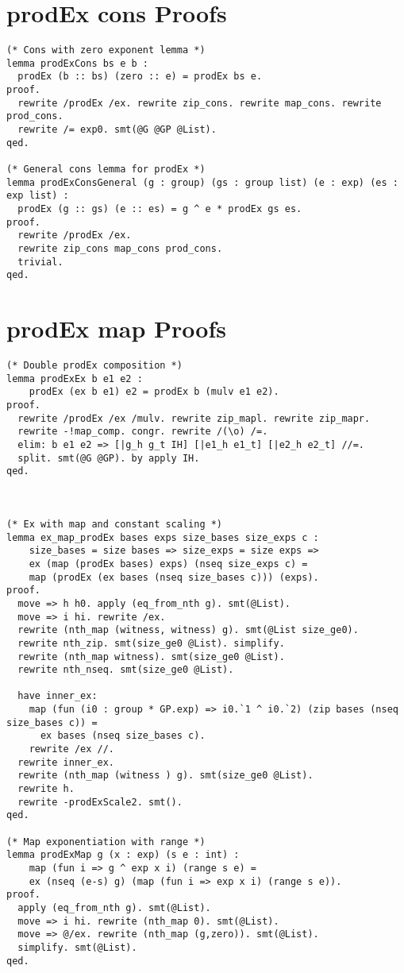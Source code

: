 \section{prodEx cons Proofs}
\label{sec:prod-cons-proofs}

\begin{lstlisting}[style=easycrypt, caption=Proof of Size Preservation Properties, breaklines=true, breakatwhitespace=true, frame=single, keepspaces=true]
(* Cons with zero exponent lemma *)
lemma prodExCons bs e b :
  prodEx (b :: bs) (zero :: e) = prodEx bs e.
proof.
  rewrite /prodEx /ex. rewrite zip_cons. rewrite map_cons. rewrite prod_cons. 
  rewrite /= exp0. smt(@G @GP @List).
qed.

(* General cons lemma for prodEx *)
lemma prodExConsGeneral (g : group) (gs : group list) (e : exp) (es : exp list) :
  prodEx (g :: gs) (e :: es) = g ^ e * prodEx gs es.
proof.
  rewrite /prodEx /ex.
  rewrite zip_cons map_cons prod_cons.
  trivial.
qed.
\end{lstlisting}

\section{prodEx map Proofs}
\label{sec:prodexnew-proofs}

\begin{lstlisting}[style=easycrypt, caption=Proof of Size Preservation Properties, breaklines=true, breakatwhitespace=true, frame=single, keepspaces=true]
(* Double prodEx composition *)
lemma prodExEx b e1 e2 :
    prodEx (ex b e1) e2 = prodEx b (mulv e1 e2).
proof.
  rewrite /prodEx /ex /mulv. rewrite zip_mapl. rewrite zip_mapr. 
  rewrite -!map_comp. congr. rewrite /(\o) /=.
  elim: b e1 e2 => [|g_h g_t IH] [|e1_h e1_t] [|e2_h e2_t] //=.
  split. smt(@G @GP). by apply IH.
qed.



(* Ex with map and constant scaling *)
lemma ex_map_prodEx bases exps size_bases size_exps c :
    size_bases = size bases => size_exps = size exps =>
    ex (map (prodEx bases) exps) (nseq size_exps c) = 
    map (prodEx (ex bases (nseq size_bases c))) (exps).
proof. 
  move => h h0. apply (eq_from_nth g). smt(@List). 
  move => i hi. rewrite /ex.
  rewrite (nth_map (witness, witness) g). smt(@List size_ge0). 
  rewrite nth_zip. smt(size_ge0 @List). simplify. 
  rewrite (nth_map witness). smt(size_ge0 @List).
  rewrite nth_nseq. smt(size_ge0 @List).

  have inner_ex: 
    map (fun (i0 : group * GP.exp) => i0.`1 ^ i0.`2) (zip bases (nseq size_bases c)) = 
      ex bases (nseq size_bases c). 
    rewrite /ex //. 
  rewrite inner_ex. 
  rewrite (nth_map (witness ) g). smt(size_ge0 @List). 
  rewrite h.
  rewrite -prodExScale2. smt().
qed.
  
(* Map exponentiation with range *)
lemma prodExMap g (x : exp) (s e : int) :
    map (fun i => g ^ exp x i) (range s e) = 
    ex (nseq (e-s) g) (map (fun i => exp x i) (range s e)).
proof.
  apply (eq_from_nth g). smt(@List). 
  move => i hi. rewrite (nth_map 0). smt(@List).
  move => @/ex. rewrite (nth_map (g,zero)). smt(@List). 
  simplify. smt(@List).
qed.

\end{lstlisting}
